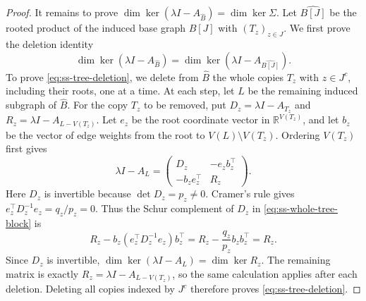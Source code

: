 \documentclass[10pt,a4paper]{article}
\theoremstyle{plain}
\theoremstyle{definition}
\newcommand{\R}{\mathbb{R}}
\begin{document}
\begin{proof}
It remains to prove $\dim\ker(\lambda I-A_{\widehat B})=\dim\ker \Sigma$.
Let $\widehat{B[J]}$ be the rooted product of the induced base graph
$B[J]$ with $(T_z)_{z\in J}$.
We first prove the deletion identity
\begin{equation}\label{eq:ss-tree-deletion}
 \dim\ker(\lambda I-A_{\widehat B})
 =\dim\ker(\lambda I-A_{\widehat{B[J]}}).
\end{equation}
To prove \cref{eq:ss-tree-deletion}, we delete from $\widehat B$
the whole copies $T_z$ with $z\in J^c$, including their roots, one at a time.
At each step, let $L$ be the remaining induced subgraph of $\widehat B$.
For the copy $T_z$ to be removed, put $D_z=\lambda I-A_{T_z}$ and
$R_z=\lambda I-A_{L-V(T_z)}$.
Let $e_z$ be the root coordinate vector in $\R^{V(T_z)}$, and let
$b_z$ be the vector of edge weights from the root to $V(L)\setminus V(T_z)$.
Ordering $V(T_z)$ first gives
\begin{equation}\label{eq:ss-whole-tree-block}
 \lambda I-A_L=
 \begin{pmatrix}D_z&-e_zb_z^{\top}\\-b_ze_z^{\top}&R_z\end{pmatrix}.
\end{equation}
Here $D_z$ is invertible because $\det D_z=p_z\ne0$.
Cramer's rule gives $e_z^{\top}D_z^{-1}e_z=q_z/p_z=0$.
Thus the Schur complement of $D_z$ in \cref{eq:ss-whole-tree-block} is
\begin{equation}\label{eq:ss-zero-tree-correction}
 R_z-b_z(e_z^{\top}D_z^{-1}e_z)b_z^{\top}
 =R_z-\frac{q_z}{p_z}b_zb_z^{\top}=R_z.
\end{equation}
Since $D_z$ is invertible,
$\dim\ker(\lambda I-A_L)=\dim\ker R_z$.
The remaining matrix is exactly $R_z=\lambda I-A_{L-V(T_z)}$,
so the same calculation applies after each deletion.
Deleting all copies indexed by $J^c$ therefore proves
\cref{eq:ss-tree-deletion}.


\end{proof}
\end{document}
